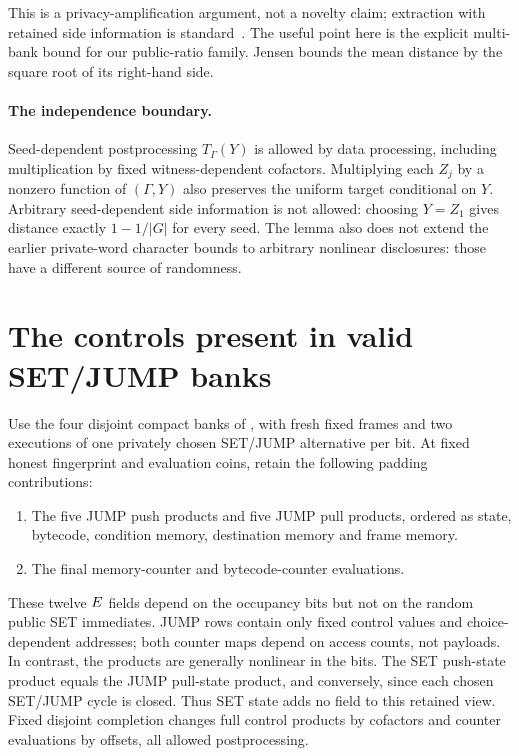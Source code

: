 \documentclass[11pt]{article}
\begin{document}
This is a privacy-amplification argument, not a novelty claim; extraction with retained side information is standard~\cite{dors}. The useful point here is the explicit multi-bank bound for our public-ratio family. Jensen bounds the mean distance by the square root of its right-hand side.

\paragraph{The independence boundary.} Seed-dependent postprocessing $T_\Gamma(Y)$ is allowed by data processing, including multiplication by fixed witness-dependent cofactors. Multiplying each $Z_j$ by a nonzero function of $(\Gamma,Y)$ also preserves the uniform target conditional on $Y$. Arbitrary seed-dependent side information is not allowed: choosing $Y=Z_1$ gives distance exactly $1-1/|G|$ for every seed. The lemma also does not extend the earlier private-word character bounds to arbitrary nonlinear disclosures: those have a different source of randomness.

\section{The controls present in valid SET/JUMP banks}

Use the four disjoint compact banks of , with fresh fixed frames and two executions of one privately chosen SET/JUMP alternative per bit. At fixed honest fingerprint and evaluation coins, retain the following padding contributions:
\begin{enumerate}
\item The five JUMP push products and five JUMP pull products, ordered as state, bytecode, condition memory, destination memory and frame memory.
\item The final memory-counter and bytecode-counter evaluations.
\end{enumerate}
These twelve $E$ fields depend on the occupancy bits but not on the random public SET immediates. JUMP rows contain only fixed control values and choice-dependent addresses; both counter maps depend on access counts, not payloads. In contrast, the products are generally nonlinear in the bits. The SET push-state product equals the JUMP pull-state product, and conversely, since each chosen SET/JUMP cycle is closed. Thus SET state adds no field to this retained view. Fixed disjoint completion changes full control products by cofactors and counter evaluations by offsets, all allowed postprocessing.
\end{document}
